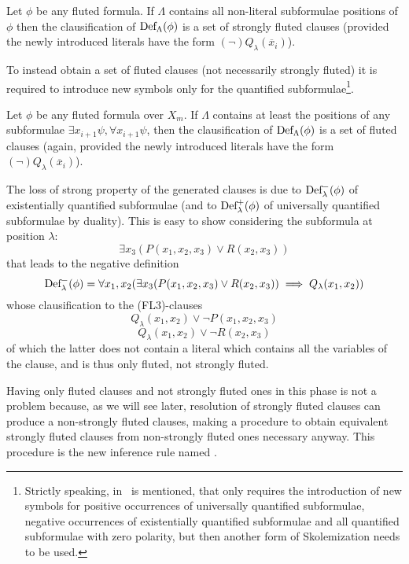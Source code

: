 \begin{lemma}
  Let \(\phi\) be any fluted formula. If \(\Lambda\) contains all non-literal subformulae positions of \(\phi\) then the clausification of \(\fldef{\Lambda}{\phi}\) is a set of strongly fluted clauses (provided the newly introduced literals have the form \((\neg)Q_\lambda(\overline{x}_i)\)).
\end{lemma}
To instead obtain a set of fluted clauses (not necessarily strongly fluted) it is required to introduce new symbols only for the quantified subformulae\footnote{
  Strictly speaking, in~\cite{hustadt2000resolution} is mentioned, that only requires the introduction of new symbols for positive occurrences of universally quantified subformulae, negative occurrences of existentially quantified subformulae and all quantified subformulae with zero polarity, but then another form of Skolemization needs to be used.
}.

\begin{lemma}\label{lem:fluted-def-constraints}
  Let \(\phi\) be any fluted formula over \(X_m\). If \(\Lambda\) contains at least the positions of any subformulae \(\exists x_{i+1}\psi, \forall x_{i+1}\psi\), then the clausification of \(\fldef{\Lambda}{\phi}\) is a set of fluted clauses (again, provided the newly introduced literals have the form \((\neg)Q_\lambda(\overline{x}_i)\)).
\end{lemma}

The loss of strong property of the generated clauses is due to \(\fldef{\lambda}[-]{\phi}\) of existentially quantified subformulae (and to \(\fldef{\lambda}[+]{\phi}\) of universally quantified subformulae by duality).
This is easy to show considering the subformula at position \(\lambda\):
  \[
    \exists x_3 (P(x_1,x_2,x_3) \lor R(x_2,x_3))
  \]
that leads to the negative definition
  \[
    \fldef{\lambda}[-]{\phi} = \forall x_1,x_2(\exists x_3 (P(x_1,x_2,x_3) \lor R(x_2,x_3)) \implies Q_\lambda(x_1,x_2))
  \]
whose clausification to the (FL3)-clauses
  \[
    Q_\lambda(x_1,x_2) \lor \neg P(x_1,x_2,x_3)
  \]
  \[
    Q_\lambda(x_1,x_2) \lor \neg R(x_2,x_3)
  \]
of which the latter does not contain a literal which contains all the variables of the clause, and is thus only fluted, not strongly fluted.

Having only fluted clauses and not strongly fluted ones in this phase is not a problem because, as we will see later, resolution of strongly fluted clauses can produce a non-strongly fluted clauses, making a procedure to obtain equivalent strongly fluted clauses from non-strongly fluted ones necessary anyway.
This procedure is the new inference rule named .
